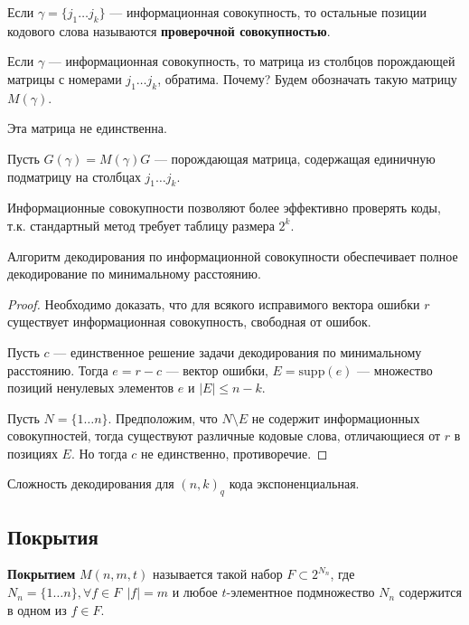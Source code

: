 \begin{definition}
    Если \(\gamma = \{j_1 \dots j_k\}\) --- информационная совокупность,
    то остальные позиции кодового слова называются \textbf{проверочной совокупностью}.
\end{definition}

Если \(\gamma\) --- информационная совокупность, то матрица из столбцов порождающей матрицы с номерами \(j_1 \dots j_k\), обратима.
Почему? \unfinished
Будем обозначать такую матрицу \(M(\gamma)\).

\begin{remark}
    Эта матрица не единственна.
\end{remark}

Пусть \(G(\gamma) = M(\gamma) G\) --- порождающая матрица, содержащая единичную подматрицу на столбцах \(j_1 \dots j_k\).

Информационные совокупности позволяют более эффективно проверять коды,
т.к. стандартный метод требует таблицу размера \(2^k\).

\begin{theorem}
    Алгоритм декодирования по информационной совокупности обеспечивает полное декодирование по минимальному расстоянию.
\end{theorem}
\begin{proof}
    Необходимо доказать, что для всякого исправимого вектора ошибки \(r\)
    существует информационная совокупность, свободная от ошибок.

    Пусть \(c\) --- единственное решение задачи декодирования по минимальному расстоянию.
    Тогда \(e = r - c\) --- вектор ошибки, \(E = \mathrm{supp}(e)\) --- множество позиций ненулевых элементов \(e\) и \(|E| \leq n - k\).

    Пусть \(N = \{1 \dots n\}\).
    Предположим, что \(N \setminus E\) не содержит информационных совокупностей,
    тогда существуют различные кодовые слова, отличающиеся от \(r\) в позициях \(E\).
    Но тогда \(c\) не единственно, противоречие.
\end{proof}

Сложность декодирования для \((n, k)_q\) кода экспоненциальная.

\subsection{Покрытия}

\begin{definition}
    \textbf{Покрытием} \(M(n,m,t)\) называется такой набор \(F \subset 2^{N_n}\), где \(N_n = \{1 \dots n\}, \forall f \in F \ \ |f| = m\) и любое \(t\)-элементное подмножество \(N_n\) содержится в одном из \(f \in F\).
\end{definition}

